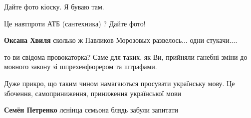 \begin{itemize}
 
Дайте фото кіоску. Я буваю там.

 
Це навтпроти АТБ (сантехника) ? Дайте фото!

\begin{itemize}
 
\textbf{Оксана Хвиля} сколько ж Павликов Морозовых развелось... одни стукачи....
\end{itemize}

 

то ви свідома провокаторка? Саме для таких, як Ви, прийняли ганебні зміни до
мовного закону зі шпрехенфюрером та штрафами.

Дуже прикро, що таким чином намагаються просувати українську мову. Це збочення,
самоприниження, приниження української мови

\begin{itemize}
 
\textbf{Семён Петренко} лєнінца сємьона блядь забули запитати

 

\end{itemize}
\end{itemize}
